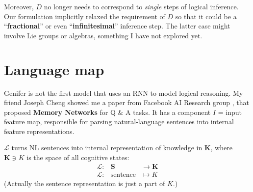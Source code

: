 \documentclass[12pt]{article}
\begin{document}
Moreover, $D$ no longer needs to correspond to \textit{single} steps of logical inference.  Our formulation implicitly relaxed the requirement of $D$ so that it could be a ``\textbf{fractional}'' or even ``\textbf{infinitesimal}'' inference step.  The latter case might involve Lie groups or algebras, something I have not explored yet.

\section{Language map}

Genifer is not the first model that uses an RNN to model logical reasoning.  My friend Joseph Cheng showed me a paper from Facebook AI Research group \cite{Weston2015}, that proposed \textbf{Memory Networks} for Q \& A tasks.  It has a component $I$ = input feature map, responsible for parsing natural-language sentences into internal feature representations.

$\mathcal{L}$ turns NL sentences into internal representation of knowledge in $\mathbf{K}$, where $\mathbf{K} \ni K$ is the space of all cognitive states:
\begin{eqnarray}
\mathcal{L} :& \mathbf{S} & \rightarrow \mathbf{K} \nonumber \\
\mathcal{L} :& \mbox{sentence} & \mapsto K \nonumber
\end{eqnarray}
(Actually the sentence representation is just a part of $K$.)

\begin{center}
\end{center}
\end{document}
